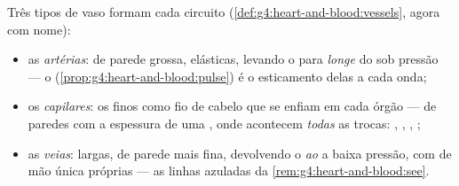 \begin{definition}\label{def:g7:heart-and-circulation:vessels}
Três tipos de vaso formam cada circuito
(\cref{def:g4:heart-and-blood:vessels}, agora com nome):
\begin{itemize}
  \item as \emph{artérias}: de parede grossa,
        elásticas, levando o  para \emph{longe} do  sob
        pressão --- o 
        (\cref{prop:g4:heart-and-blood:pulse}) é o esticamento delas a
        cada onda;
  \item os \emph{capilares}: os  finos como fio de
        cabelo que se enfiam em cada órgão --- de paredes com a
        espessura de uma , onde acontecem \emph{todas} as
        trocas: , , , ;
  \item as \emph{veias}: largas, de parede mais fina,
        devolvendo o  \emph{ao}  a baixa pressão, com
         de mão única próprias --- as linhas azuladas da
        \cref{rem:g4:heart-and-blood:see}.
\end{itemize}
\end{definition}

